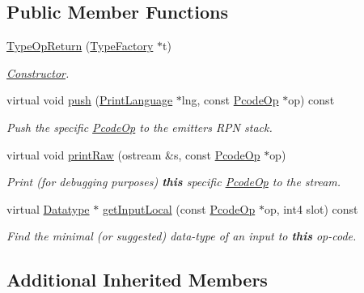 \subsection*{Public Member Functions}
\begin{DoxyCompactItemize}
\item 
\mbox{\hyperlink{class_type_op_return_a89ebf2c0408321fb592255a03fe20aed}{Type\+Op\+Return}} (\mbox{\hyperlink{class_type_factory}{Type\+Factory}} $\ast$t)
\begin{DoxyCompactList}\small\item\em \mbox{\hyperlink{class_constructor}{Constructor}}. \end{DoxyCompactList}\item 
virtual void \mbox{\hyperlink{class_type_op_return_a8a11b331d3a293b7dbe4bce287313abf}{push}} (\mbox{\hyperlink{class_print_language}{Print\+Language}} $\ast$lng, const \mbox{\hyperlink{class_pcode_op}{Pcode\+Op}} $\ast$op) const
\begin{DoxyCompactList}\small\item\em Push the specific \mbox{\hyperlink{class_pcode_op}{Pcode\+Op}} to the emitter\textquotesingle{}s R\+PN stack. \end{DoxyCompactList}\item 
virtual void \mbox{\hyperlink{class_type_op_return_af0becd757dd0479c6f8fe15b6b2ce1fc}{print\+Raw}} (ostream \&s, const \mbox{\hyperlink{class_pcode_op}{Pcode\+Op}} $\ast$op)
\begin{DoxyCompactList}\small\item\em Print (for debugging purposes) {\bfseries{this}} specific \mbox{\hyperlink{class_pcode_op}{Pcode\+Op}} to the stream. \end{DoxyCompactList}\item 
virtual \mbox{\hyperlink{class_datatype}{Datatype}} $\ast$ \mbox{\hyperlink{class_type_op_return_a524940b2f4716701e5d0c62b16c6b001}{get\+Input\+Local}} (const \mbox{\hyperlink{class_pcode_op}{Pcode\+Op}} $\ast$op, int4 slot) const
\begin{DoxyCompactList}\small\item\em Find the minimal (or suggested) data-\/type of an input to {\bfseries{this}} op-\/code. \end{DoxyCompactList}\end{DoxyCompactItemize}
\subsection*{Additional Inherited Members}


